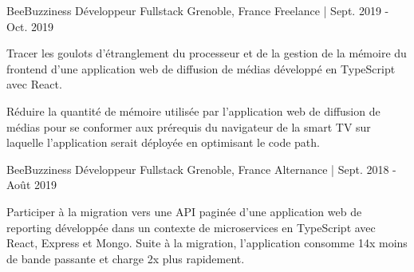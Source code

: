 

\begin{cventries}

  \cventry
  	{BeeBuzziness} %
    {Développeur Fullstack} %
    {Grenoble, France} %
    {Freelance | Sept. 2019 - Oct. 2019} %
    {
      \begin{cvitems} %
        \item {Tracer les goulots d'étranglement du processeur et de la gestion de la mémoire du frontend d'une application web de diffusion de médias développé en TypeScript avec React.}
        \item {Réduire la quantité de mémoire utilisée par l'application web de diffusion de médias pour se conformer aux prérequis du navigateur de la smart TV sur laquelle l'application serait déployée en optimisant le code path.}
      \end{cvitems}
    }

  \cventry
  	{BeeBuzziness} %
    {Développeur Fullstack} %
    {Grenoble, France} %
    {Alternance | Sept. 2018 - Août 2019} %
    {
      \begin{cvitems} %
        \item {Participer à la migration vers une API paginée d'une application web de reporting développée dans un contexte de microservices en TypeScript avec React, Express et Mongo.
        Suite à la migration, l'application consomme 14x moins de bande passante et charge 2x plus rapidement.}
      \end{cvitems}
    }


\end{cventries}
